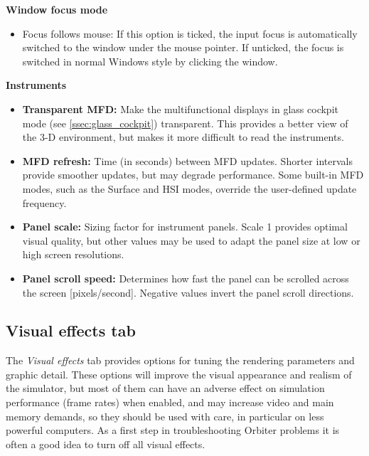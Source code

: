 \documentclass[Orbiter User Manual.tex]{subfiles}
\begin{document}
\noindent
\textbf{Window focus mode}

\begin{itemize}
\item Focus follows mouse: If this option is ticked, the input focus is automatically switched to the window under the mouse pointer. If unticked, the focus is switched in normal Windows style by clicking the window.
\end{itemize}

\noindent
\textbf{Instruments}

\begin{itemize}
\item \textbf{Transparent MFD:} Make the multifunctional displays in glass cockpit mode (see \ref{ssec:glass_cockpit}) transparent. This provides a better view of the 3-D environment, but makes it more difficult to read the instruments.
\item \textbf{MFD refresh:} Time (in seconds) between MFD updates. Shorter intervals provide smoother updates, but may degrade performance. Some built-in MFD modes, such as the Surface and HSI modes, override the user-defined update frequency.
\item \textbf{Panel scale:} Sizing factor for instrument panels. Scale 1 provides optimal visual quality, but other values may be used to adapt the panel size at low or high screen resolutions.
\item \textbf{Panel scroll speed:} Determines how fast the panel can be scrolled across the screen [pixels/second]. Negative values invert the panel scroll directions.
\end{itemize}


\subsection{Visual effects tab}
The \textit{Visual effects} tab provides options for tuning the rendering parameters and graphic detail. These options will improve the visual appearance and realism of the simulator, but most of them can have an adverse effect on simulation performance (frame rates) when enabled, and may increase video and main memory demands, so they should be used with care, in particular on less powerful computers. As a first step in troubleshooting Orbiter problems it is often a good idea to turn off all visual effects.

\begin{figure}[H]
	\centering
\end{figure}
\end{document}
